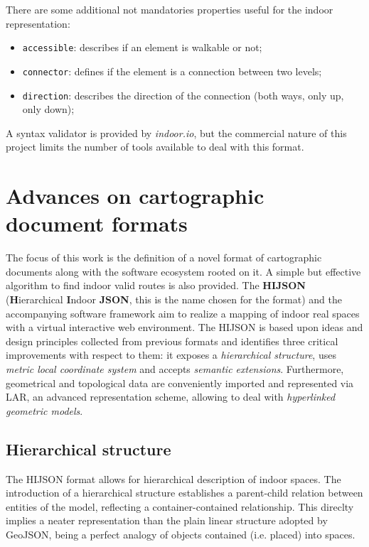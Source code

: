 \documentclass{sig-alternate}
\begin{document}
There are some additional not mandatories properties useful for
the indoor representation:

\begin{itemize}
\itemsep1pt\parskip0pt
\item
  \texttt{accessible}: describes if an element is walkable or not;
\item
  \texttt{connector}: defines if the element is a connection between two
  levels;
\item
  \texttt{direction}: describes the direction of the connection (both
  ways, only up, only down);
\end{itemize}

A syntax validator is provided by \emph{indoor.io}, but the commercial nature
of  this project limits the number of tools available to deal with this
format.

\section{Advances on cartographic document formats}\label{advances-on-cartographic-document-format}

The focus of this work is the definition of a novel format of cartographic
documents along with the software ecosystem rooted on it. A simple but
effective  algorithm to find indoor valid routes is also provided. The
\textbf{HIJSON} (\textbf{H}ierarchical \textbf{I}ndoor \textbf{JSON}, this is
the name chosen for the format) and the accompanying software framework aim
to realize a mapping of indoor real spaces with a virtual interactive web
environment. The HIJSON is based upon ideas and design principles collected
from previous formats and identifies three critical improvements with respect
to them: it exposes a \emph{hierarchical structure}, uses \emph{metric local
coordinate system} and accepts \emph{semantic extensions}. Furthermore, geometrical 
and topological data are conveniently imported and represented via LAR, an advanced 
representation scheme, allowing to deal with \emph{hyperlinked geometric models}.

\subsection{Hierarchical structure}\label{hierarchical-structure}

The HIJSON format allows for hierarchical description of indoor spaces.  The
introduction of a hierarchical structure establishes a parent-child relation
between entities of the model, reflecting a container-contained relationship.
This direclty implies a neater representation than the plain linear structure
adopted  by GeoJSON, being a perfect analogy of objects contained (i.e.
placed) into spaces.
\end{document}
